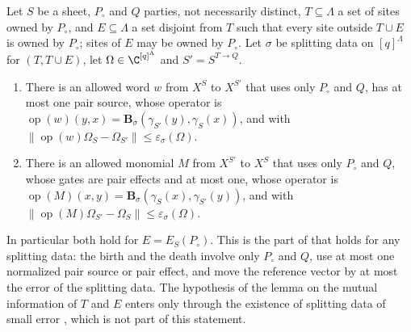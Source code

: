 \begin{theorem}
    \label{thm:party_birth}
    \leanok
    Let $S$ be a sheet, $P_\circ$ and $Q$ parties, not necessarily distinct, $T\subseteq\Lambda$
    a set of sites owned by $P_\circ$, and $E\subseteq\Lambda$ a set disjoint from $T$ such that
    every site outside $T\cup E$ is owned by $P_\circ$; sites of $E$ may be owned by $P_\circ$.
    Let $\sigma$ be splitting data on $[q]^\Lambda$ for $(T,T\cup E)$, let
    $\Omega\in\C^{[q]^\Lambda}$ and $S'=S^{T\to Q}$.
    \begin{enumerate}
        \item There is an allowed word $w$ from $X^S$ to $X^{S'}$ that uses only $P_\circ$ and $Q$,
              has at most one pair source, whose operator is
              $\operatorname{op}(w)(y,x)=\mathbf B_\sigma(\gamma_{S'}(y),\gamma_S(x))$, and with
              $\lVert\operatorname{op}(w)\Omega_S-\Omega_{S'}\rVert\leq\varepsilon_\sigma(\Omega)$.
        \item There is an allowed monomial $M$ from $X^{S'}$ to $X^S$ that uses only $P_\circ$
              and $Q$, whose gates are pair effects and at most one, whose operator is
              $\operatorname{op}(M)(x,y)=\mathbf B_\sigma(\gamma_S(x),\gamma_{S'}(y))$, and with
              $\lVert\operatorname{op}(M)\Omega_{S'}-\Omega_S\rVert\leq\varepsilon_\sigma(\Omega)$.
    \end{enumerate}
    In particular both hold for $E=E_S(P_\circ)$. This is the part of
    \cite[Lemma~6.5]{OpenAI2026PolynomialPEPS} that holds for any splitting data: the birth and
    the death involve only $P_\circ$ and $Q$, use at most one normalized pair source or pair
    effect, and move the reference vector by at most the error of the splitting data. The
    hypothesis of the lemma on the mutual information of $T$ and $E$ enters only through the
    existence of splitting data of small error \cite[Lemma~6.4]{OpenAI2026PolynomialPEPS},
    which is not part of this statement.
\end{theorem}
